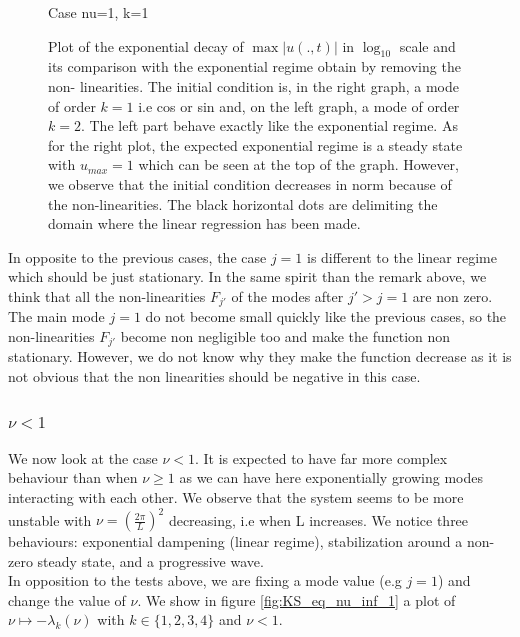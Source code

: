 \documentclass[12pt]{article}
\begin{document}
\begin{figure}[htbp]
\begin{minipage}[b]{0.45\textwidth}
        \caption{Case nu=1, k=1}
        \label{fig:image2}
    \end{minipage}
    \caption{Plot of the exponential decay of $\max|u(.,t)|$ in $\log_{10}$ scale and its comparison with the exponential regime obtain by removing the non-
    linearities. The initial condition is, in the right graph, a mode of order $k=1$ i.e cos or sin and, on the left graph, a mode of order $k=2$. The left part behave exactly like the exponential regime. As for the right plot, 
    the expected exponential regime is a steady state with $u_{max} =  1$ which can be seen at the top of the graph. However, we observe that the initial condition decreases in norm because of the non-linearities. The black horizontal dots are delimiting the domain where the linear regression has been  made.}
    \label{fig:both_images}
\end{figure}

In opposite to the previous cases, the case $j=1$ is different to the linear regime which should be just stationary. In the same spirit than 
the remark above, we think that all the non-linearities $F_{j'}$ of the modes after $j'>j=1$ are non zero. The main mode $j=1$ do not become 
small quickly like the previous cases, so the non-linearities $F_{j'}$ become non negligible too and make the function non stationary. 
However, we do not know why they make the function decrease as it is not obvious that the non linearities should be negative in this case.

\subsubsection{\texorpdfstring{$\nu <1$}{nu < 1}}
We now look at the case $\nu <1$. It is expected to have far more complex behaviour than when $\nu \geq 1$ as we can have here exponentially 
growing modes interacting with each other. We observe that the system seems to be more unstable with $\nu = (\frac{2\pi}{L})^2$ decreasing, i.e when L increases. 
We notice three behaviours: exponential dampening (linear regime), stabilization around a non-zero steady state, and a progressive wave.
\\

In opposition to the tests above, we are fixing a mode value (e.g $j=1$) and change the value of $\nu$. We show in figure \ref{fig:KS_eq_nu_inf_1} 
a plot of $\nu \mapsto -\lambda_k(\nu)$ with $k \in \{ 1, 2, 3, 4\}$ and $\nu < 1$.
\end{document}

